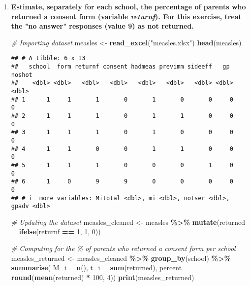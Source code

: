 \documentclass[]{article}
\newenvironment{Shaded}{\begin{snugshade}}{\end{snugshade}}
\newcommand{\AttributeTok}[1]{\textcolor[rgb]{0.13,0.29,0.53}{#1}}
\newcommand{\CommentTok}[1]{\textcolor[rgb]{0.56,0.35,0.01}{\textit{#1}}}
\newcommand{\DecValTok}[1]{\textcolor[rgb]{0.00,0.00,0.81}{#1}}
\newcommand{\FunctionTok}[1]{\textcolor[rgb]{0.13,0.29,0.53}{\textbf{#1}}}
\newcommand{\NormalTok}[1]{#1}
\newcommand{\OtherTok}[1]{\textcolor[rgb]{0.56,0.35,0.01}{#1}}
\newcommand{\SpecialCharTok}[1]{\textcolor[rgb]{0.81,0.36,0.00}{\textbf{#1}}}
\newcommand{\StringTok}[1]{\textcolor[rgb]{0.31,0.60,0.02}{#1}}
\begin{document}
\begin{enumerate}[label=(\alph*)]

\item \textbf{Estimate, separately for each school, the percentage of parents who returned a consent form (variable \textit{returnf}). For this exercise, treat the "no answer" responses (value 9) as not returned.}

\begin{Shaded}
\begin{Highlighting}[]
\CommentTok{\# Importing dataset}
\NormalTok{measles }\OtherTok{\textless{}{-}} \FunctionTok{read\_excel}\NormalTok{(}\StringTok{"measles.xlsx"}\NormalTok{)}
\FunctionTok{head}\NormalTok{(measles)}
\end{Highlighting}
\end{Shaded}

\begin{verbatim}
## # A tibble: 6 x 13
##   school  form returnf consent hadmeas previmm sideeff   gp noshot 
##    <dbl> <dbl>   <dbl>   <dbl>   <dbl>   <dbl>   <dbl> <dbl>  <dbl>  
## 1      1     1       1       0       1       0       0     0      0      
## 2      1     1       1       0       1       1       0     0      0      
## 3      1     1       1       0       1       0       0     0      0     
## 4      1     1       0       0       1       1       0     0      0      
## 5      1     1       1       0       0       0       1     0      0    
## 6      1     0       9       9       0       0       0     0      0      
## # i  more variables: Mitotal <dbl>, mi <dbl>, notser <dbl>, gpadv <dbl>
\end{verbatim}

\vspace{1em}

\begin{Shaded}
\begin{Highlighting}[]
\CommentTok{\# Updating the dataset}
\NormalTok{measles\_cleaned }\OtherTok{\textless{}{-}}\NormalTok{ measles }\SpecialCharTok{\%\textgreater{}\%}
  \FunctionTok{mutate}\NormalTok{(}\AttributeTok{returned =} \FunctionTok{ifelse}\NormalTok{(returnf }\SpecialCharTok{==} \DecValTok{1}\NormalTok{, }\DecValTok{1}\NormalTok{, }\DecValTok{0}\NormalTok{))}
  
\CommentTok{\# Computing for the \% of parents who returned a consent form per school}
\NormalTok{measles\_returned }\OtherTok{\textless{}{-}}\NormalTok{ measles\_cleaned }\SpecialCharTok{\%\textgreater{}\%}
  \FunctionTok{group\_by}\NormalTok{(school) }\SpecialCharTok{\%\textgreater{}\%}
  \FunctionTok{summarise}\NormalTok{(}
    \AttributeTok{M\_i =} \FunctionTok{n}\NormalTok{(),}
    \AttributeTok{t\_i =} \FunctionTok{sum}\NormalTok{(returned),}
    \AttributeTok{percent =} \FunctionTok{round}\NormalTok{(}\FunctionTok{mean}\NormalTok{(returned) }\SpecialCharTok{*} \DecValTok{100}\NormalTok{, }\DecValTok{4}\NormalTok{))}
\FunctionTok{print}\NormalTok{(measles\_returned)}
\end{Highlighting}
\end{Shaded}


\end{enumerate}
\end{document}
